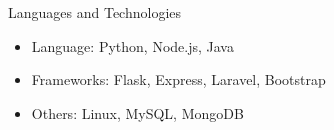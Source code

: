 \documentclass[]{mcdowellcv}
\begin{document}
	
		
		
	\newpage
	\begin{cvsection}{Languages and Technologies}
		\begin{cvsubsection}{}{}{}	
			\begin{itemize}
				\item Language: Python, Node.js, Java
				\item Frameworks: Flask, Express, Laravel, Bootstrap
				\item Others: Linux, MySQL, MongoDB
			\end{itemize}
		\end{cvsubsection}
	\end{cvsection}
	
	
\end{document}
